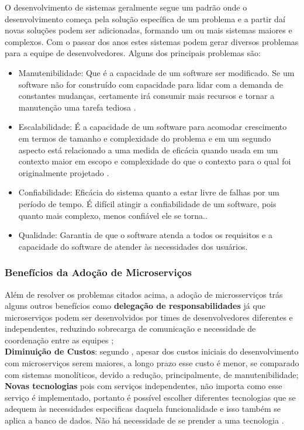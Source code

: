 \documentclass[12pt]{article}
\begin{document}
O desenvolvimento de sistemas geralmente segue um padrão onde o desenvolvimento começa pela solução específica de um problema e a partir daí novas soluções podem ser adicionadas, formando um ou mais sistemas maiores e complexos. Com o passar dos anos estes sistemas podem gerar diversos problemas para a equipe de desenvolvedores. Alguns dos principais problemas são:
\begin{itemize}
	\item Manutenibilidade: Que é a capacidade de um software ser modificado. Se um software não for construído com capacidade para lidar com a demanda de constantes mudanças, certamente irá consumir mais recursos e tornar a manutenção uma tarefa tediosa \cite{Velmourougan2014}.
	\item Escalabilidade: É a capacidade de um software para acomodar crescimento em termos de tamanho e complexidade do problema e em um segundo aspecto está relacionado a uma medida de eficácia quando usada em um contexto maior em escopo e complexidade do que o contexto para o qual foi originalmente projetado \cite{Ibrahim2009}.
	\item Confiabilidade: Eficácia do sistema quanto a estar livre de falhas por um período de tempo. É difícil atingir a confiabilidade de um software, pois quanto mais complexo, menos confiável ele se torna.\cite{pan1999}.
	\item Qualidade: Garantia de que o software atenda a todos os requisitos e a capacidade do software de atender às necessidades dos usuários.
\end{itemize}


\subsubsection{Benefícios da Adoção de Microserviços}
Além de resolver os problemas citados acima, a adoção de microsserviços trás alguns outros benefícios como \textbf{delegação de responsabilidades} já que microserviços podem ser desenvolvidos por times de desenvolvedores diferentes e independentes, reduzindo sobrecarga de comunicação e necessidade de coordenação entre as equipes \cite{Taibi}; 
\\
\textbf{Diminuição de Custos}: segundo \cite{Taibi}, apesar dos custos iniciais do desenvolvimento com microserviços serem maiores, a longo prazo esse custo é menor, se comparado com sistemas monolíticos, devido a redução, principalmente, de manutenibilidade; 
\\
\textbf{Novas tecnologias} pois com serviços independentes, não importa como esse serviço é implementado, portanto é possível escolher diferentes tecnologias que se adequem às necessidades especificas daquela funcionalidade e isso também se aplica a banco de dados. Não há necessidade de se prender a uma tecnologia \cite{Richter2017a}. 
\end{document}
